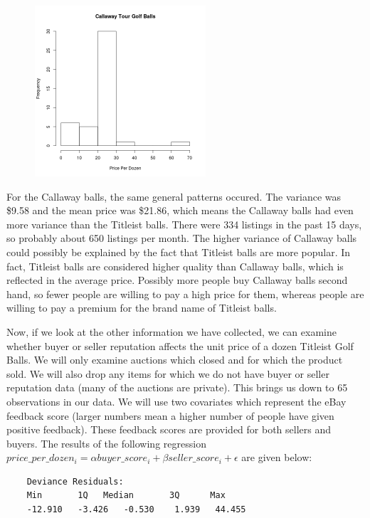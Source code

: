 \documentclass[psamsfonts]{amsart}
\newenvironment{sol}{\vspace{0.25cm}{\large \bfseries Solution:}}{\qedsymbol}
\begin{document}
\begin{sol}
\begin{figure}[h!]
\includegraphics[width=2.5in]{unit_price_histogram_callaway.png}
\end{figure}

For the Callaway balls, the same general patterns occured. The variance was \$9.58 and the mean price was \$21.86, which means the Callaway balls had even more variance than the Titleist balls. There were 334 listings in the past 15 days, so probably about 650 listings per month. The higher variance of Callaway balls could possibly be explained by the fact that Titleist balls are more popular. In fact, Titleist balls are considered higher quality than Callaway balls, which is reflected in the average price. Possibly more people buy Callaway balls second hand, so fewer people are willing to pay a high price for them, whereas people are willing to pay a premium for the brand name of Titleist balls.

Now, if we look at the other information we have collected, we can examine whether buyer or seller reputation affects the unit price of a dozen Titleist Golf Balls. We will only examine auctions which closed and for which the product sold. We will also drop any items for which we do not have buyer or seller reputation data (many of the auctions are private). This brings us down to 65 observations in our data. We will use two covariates which represent the eBay feedback score (larger numbers mean a higher number of people have given positive feedback). These feedback scores are provided for both sellers and buyers. The results of the following regression $price\_per\_dozen_i = \alpha buyer\_score_i + \beta seller\_score_i + \epsilon$ are given below:

\begin{verbatim}
    Deviance Residuals: 
    Min       1Q   Median       3Q      Max  
    -12.910   -3.426   -0.530    1.939   44.455  
    

\end{verbatim}
\end{sol}
\end{document}
